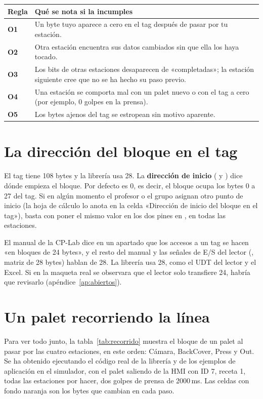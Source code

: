 \begin{center}
\small
\begin{tabularx}{\textwidth}{>{\bfseries}p{1.0cm}X}
\toprule
Regla & Qué se nota si la incumples \\
\midrule
O1 & Un byte tuyo aparece a cero en el tag después de pasar por tu estación. \\
O2 & Otra estación encuentra sus datos cambiados sin que ella los haya tocado. \\
O3 & Los bits de otras estaciones desaparecen de «completadas»; la estación siguiente cree que no se ha hecho su paso previo. \\
O4 & Una estación se comporta mal con un palet nuevo o con el tag a cero (por ejemplo, 0 golpes en la prensa). \\
O5 & Los bytes ajenos del tag se estropean sin motivo aparente. \\
\bottomrule
\end{tabularx}
\end{center}

\section{La dirección del bloque en el tag}
El tag tiene 108 bytes y la librería usa 28. La \textbf{dirección de inicio} ( y ) dice dónde empieza el bloque. Por defecto es 0, es decir, el bloque ocupa los bytes 0 a 27 del tag. Si en algún momento el profesor o el grupo asignan otro punto de inicio (la hoja de cálculo lo anota en la celda «Dirección de inicio del bloque en el tag»), basta con poner el mismo valor en los dos pines en , en todas las estaciones.

\begin{ojo}
El manual de la CP-Lab dice en un apartado que los accesos a un tag se hacen «en bloques de 24 bytes», y el resto del manual y las señales de E/S del lector (, matriz de 28 bytes) hablan de 28. La librería usa 28, como el UDT del lector y el Excel. Si en la maqueta real se observara que el lector solo transfiere 24, habría que revisarlo (apéndice~\ref{ap:abiertos}).
\end{ojo}

\section{Un palet recorriendo la línea}
Para ver todo junto, la tabla~\ref{tab:recorrido} muestra el bloque de un palet al pasar por las cuatro estaciones, en este orden: Cámara, BackCover, Press y Out. Se ha obtenido ejecutando el código real de la librería y de los ejemplos de aplicación en el simulador, con el palet saliendo de la HMI con ID 7, receta 1, todas las estaciones por hacer, dos golpes de prensa de 2000\,ms. Las celdas con fondo naranja son los bytes que cambian en cada paso.

